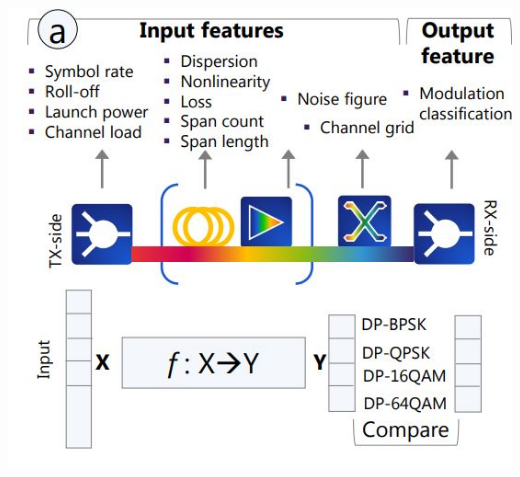 \documentclass[letterpaper,titlepage,11pt]{article}
\begin{document}
\begin{center}
\includegraphics[scale = 1]{img1.JPG}
\end{center}

%


\end{document}

